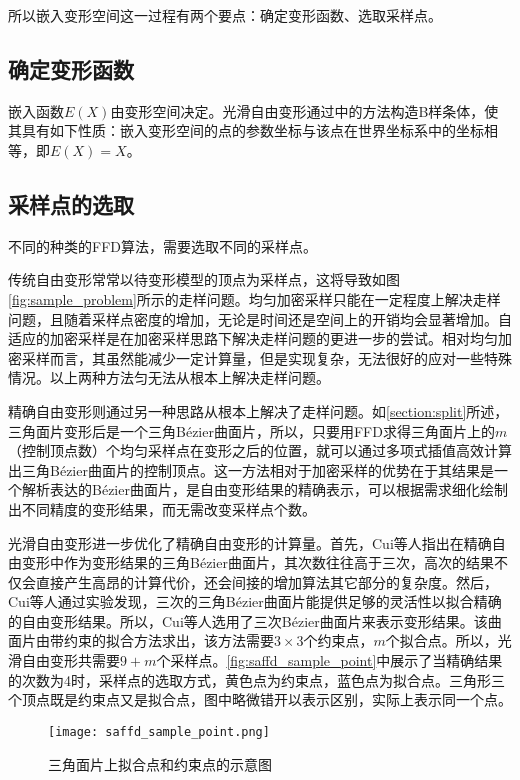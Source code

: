 所以嵌入变形空间这一过程有两个要点：确定变形函数、选取采样点。

\subsection{确定变形函数}
嵌入函数$E(X)$由变形空间决定。光滑自由变形通过\cite{Feng02}中的方法构造B样条体，使其具有如下性质：嵌入变形空间的点的参数坐标与该点在世界坐标系中的坐标相等，即$E(X)=X$。

\subsection{采样点的选取}
不同的种类的FFD算法，需要选取不同的采样点。

传统自由变形常常以待变形模型的顶点为采样点，这将导致如图\autoref{fig:sample_problem}所示的走样问题。均匀加密采样只能在一定程度上解决走样问题，且随着采样点密度的增加，无论是时间还是空间上的开销均会显著增加。自适应的加密采样\cite{parry1986, gain1999, griessmair1989deformation}是在加密采样思路下解决走样问题的更进一步的尝试。相对均匀加密采样而言，其虽然能减少一定计算量，但是实现复杂，无法很好的应对一些特殊情况。以上两种方法匀无法从根本上解决走样问题。

精确自由变形\cite{Feng00}则通过另一种思路从根本上解决了走样问题。如\ref{section:split}所述，三角面片变形后是一个三角Bézier曲面片，所以，只要用FFD求得三角面片上的$m$（控制顶点数）个均匀采样点在变形之后的位置，就可以通过多项式插值高效计算出三角Bézier曲面片的控制顶点。这一方法相对于加密采样的优势在于其结果是一个解析表达的Bézier曲面片，是自由变形结果的精确表示，可以根据需求细化绘制出不同精度的变形结果，而无需改变采样点个数。

光滑自由变形\cite{Cui15}进一步优化了精确自由变形的计算量。首先，Cui等人指出在精确自由变形中作为变形结果的三角Bézier曲面片，其次数往往高于三次，高次的结果不仅会直接产生高昂的计算代价，还会间接的增加算法其它部分的复杂度。然后，Cui等人通过实验发现，三次的三角Bézier曲面片能提供足够的灵活性以拟合精确的自由变形结果。所以，Cui等人选用了三次Bézier曲面片来表示变形结果。该曲面片由带约束的拟合方法求出，该方法需要$3\times3$个约束点，$m$个拟合点。所以，光滑自由变形共需要$9+m$个采样点。\autoref{fig:saffd_sample_point}中展示了当精确结果的次数为4时，采样点的选取方式，黄色点为约束点，蓝色点为拟合点。三角形三个顶点既是约束点又是拟合点，图中略微错开以表示区别，实际上表示同一个点。

\begin{figure}[htbp]
	\centering
	\texttt{[image: saffd\_sample\_point.png]}
    \caption{三角面片上拟合点和约束点的示意图}\label{fig:saffd_sample_point}
\end{figure}



